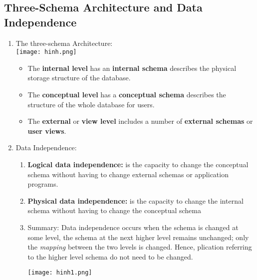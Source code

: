 \documentclass[10pt]{article}
\begin{document}
\subsection{Three-Schema Architecture and Data Independence}
\begin{enumerate}
	\item The three-schema Architecture: \\
	
	\texttt{[image: hinh.png]}

	\begin{itemize}
		\item The \textbf{internal level} has an \textbf{internal schema} describes the physical storage structure of the database.
		\item The \textbf{conceptual level} has a \textbf{conceptual schema} describes the structure of the whole database for users.
		\item The \textbf{external} or \textbf{view level} includes a number of \textbf{external schemas} or \textbf{user views}.
	\end{itemize}

	\item Data Independence: 
	\begin{enumerate}
		\item \textbf{Logical data independence:} is the capacity to change the conceptual schema without having to change external schemas or application programs.
		\item \textbf{Physical data independence:} is the capacity to change the internal schema without having to change the conceptual schema
		\item Summary: Data independence occurs when the schema is changed at some level, the schema at the next higher level remains unchanged; only the \textit{mapping} between the two levels is changed. Hence, plication referring to the higher level schema do not need to be changed.

		\bigbreak
		\texttt{[image: hinh1.png]}
		\bigbreak 
	\end{enumerate}
\end{enumerate}
\end{document}
